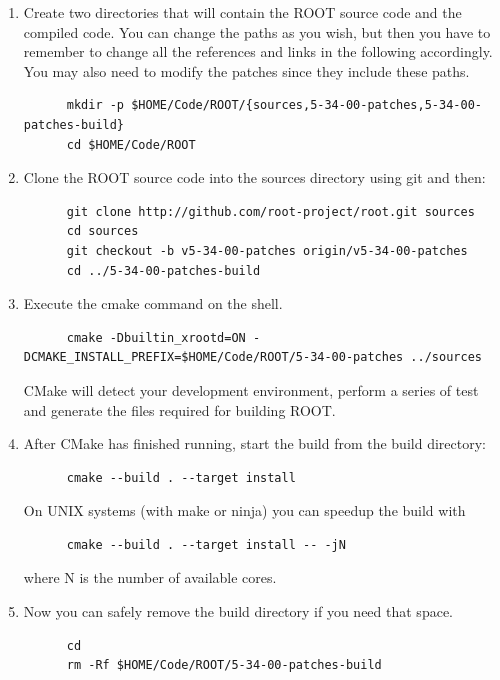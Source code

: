 \begin{enumerate}[resume]
\item\label{root-2} Create two directories that will contain the ROOT source code
  and the compiled code. You can change the paths as you wish, but
  then you have to remember to change all the references and links in
  the following accordingly. You may also need to modify the patches
  since they include these paths.
\begin{lstlisting}
      mkdir -p $HOME/Code/ROOT/{sources,5-34-00-patches,5-34-00-patches-build}
      cd $HOME/Code/ROOT
\end{lstlisting}
\item\label{root-3} Clone the ROOT source code into the sources directory using git
  and then:
\begin{lstlisting}
      git clone http://github.com/root-project/root.git sources
      cd sources
      git checkout -b v5-34-00-patches origin/v5-34-00-patches
      cd ../5-34-00-patches-build
\end{lstlisting}
\item\label{root-4} Execute the cmake command on the shell.
\begin{lstlisting}
      cmake -Dbuiltin_xrootd=ON -DCMAKE_INSTALL_PREFIX=$HOME/Code/ROOT/5-34-00-patches ../sources
\end{lstlisting}
  CMake will detect your development environment, perform a series of
  test and generate the files required for building ROOT.\@
\item After CMake has finished running, start the build from the build
  directory:
\begin{lstlisting}
      cmake --build . --target install
\end{lstlisting}
  On UNIX systems (with make or ninja) you can speedup the build with%
\begin{lstlisting}
      cmake --build . --target install -- -jN
\end{lstlisting}
  where N is the number of available cores.
\item Now you can safely remove the build directory if you need that
  space.
\begin{lstlisting}
      cd
      rm -Rf $HOME/Code/ROOT/5-34-00-patches-build
\end{lstlisting}


\end{enumerate}
